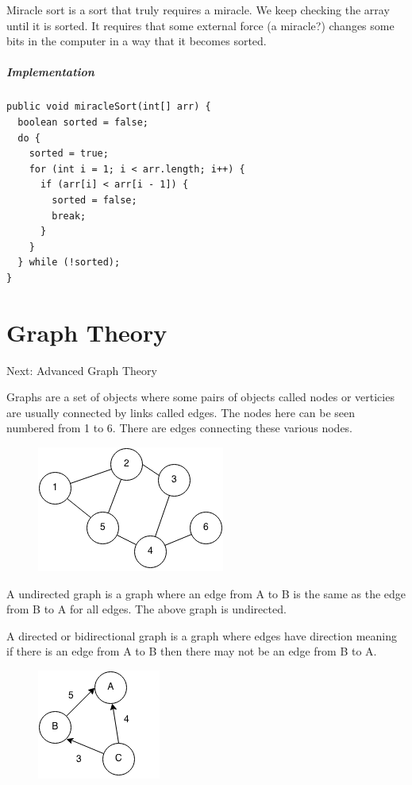 \documentclass[11pt,oneside]{book}
\makeatletter
\def\maxwidth#1{\ifdim\Gin@nat@width>#1 #1\else\Gin@nat@width\fi}
\makeatother
\begin{document}
Miracle sort is a sort that truly requires a miracle. We keep checking the array until it is sorted. It requires that some external force (a miracle?) changes some bits in the computer in a way that it becomes sorted.

\subsubsection{Implementation}

\begin{lstlisting}
public void miracleSort(int[] arr) {
  boolean sorted = false;
  do {
    sorted = true;
    for (int i = 1; i < arr.length; i++) {
      if (arr[i] < arr[i - 1]) {
        sorted = false;
        break;
      }
    }
  } while (!sorted);
}
\end{lstlisting}

\part{ Graph Theory }
    

Next: Advanced Graph Theory

Graphs are a set of objects where some pairs of objects  called nodes or verticies are usually connected by links called edges. The nodes here can be seen numbered from 1 to 6. There are edges connecting these various nodes.

\vspace{5px}\begin{figure}[H]\centering
        \includegraphics[width=0.66\maxwidth{\textwidth}]{graph.png}
        \end{figure}

A undirected graph is a graph where an edge from A to B is the same as the edge from B to A for all edges. The above graph is undirected.

A directed or bidirectional graph is a graph where edges have direction meaning if there is an edge from A to B then there may not be an edge from B to A.

\vspace{5px}\begin{figure}[H]\centering
        \includegraphics[width=0.66\maxwidth{\textwidth}]{digraph.png}
        \end{figure}
\end{document}
